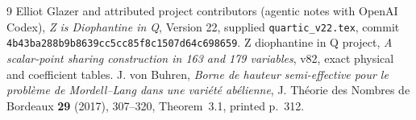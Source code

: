 \documentclass[11pt]{article}
\begin{document}
\begin{thebibliography}{9}
 Elliot Glazer and attributed project contributors (agentic notes with OpenAI Codex), \emph{Z is Diophantine in Q}, Version 22,
supplied \texttt{quartic\_v22.tex}, commit
\texttt{4b43ba288b9b8639cc5cc85f8c1507d64c698659}.
 Z diophantine in Q project,
\emph{A scalar-point sharing construction in 163 and 179 variables},
v82, exact physical and coefficient tables.
 J. von Buhren,
\emph{Borne de hauteur semi-effective pour le probl\`eme de
Mordell--Lang dans une vari\'et\'e ab\'elienne},
J. Th\'eorie des Nombres de Bordeaux \textbf{29} (2017),
307--320, Theorem~3.1, printed p.~312.
\end{thebibliography}
\end{document}
